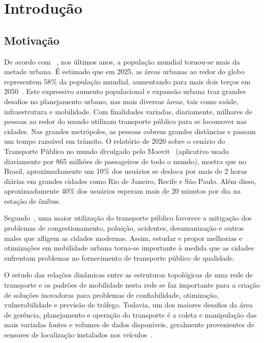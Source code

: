 


\chapter{Introdução}\label{cap:introducao}

\section{Motivação}

De acordo com ~\cite{Dem:20}, nos últimos anos, a população mundial tornou-se mais da metade urbana. É estimado que em 2025, as áreas urbanas ao redor do globo representem 58\% da população mundial, aumentando para mais dois terços em 2050~\cite{new:20}. 
Este expressivo aumento populacional e expansão urbana traz grandes desafios no planejamento urbano, nas mais diversas áreas, tais como saúde, infraestrutura e mobilidade. 
Com finalidades variadas, diariamente, milhares de pessoas ao redor do mundo utilizam transporte público para se locomover nas cidades.
Nas grandes metrópoles, as pessoas cobrem grandes distâncias e passam um tempo razoável em trânsito.
O relatório de 2020 sobre o cenário do Transporte Público no mundo divulgado pelo Moovit~\cite{Mov:20} (aplicativo usado diariamente por 865 milhões de passageiros de todo o mundo), mostra que no Brasil, aproximadamente
um 10\% dos usuários se desloca por mais de 2 horas diárias em grandes cidades como Rio de Janeiro, Recife e São Paulo. Além disso, aproximadamente 40\% dos usuários esperam mais de 20 minutos por dia na estação de ônibus.

\textcolor{courb2020}{
Segundo~\cite{fer:04}, uma maior utilização do transporte público favorece a mitigação dos problemas de congestionamento, poluição, acidentes, desumanização e outros males que afligem as cidades modernas. 
Assim, estudar e propor melhorias e otimizações em mobilidade urbana torna-se importante à medida que as cidades enfrentam problemas no fornecimento de transporte público de qualidade.
}

\textcolor{courb2020}{
O estudo das relações dinâmicas entre as estruturas topológicas de uma rede de transporte e os padrões de mobilidade nesta rede se faz importante para a criação de soluções inovadoras para problemas de confiabilidade, otimização, vulnerabilidade e previsão de tráfego. Todavia, um dos maiores desafios da área de gerência, planejamento e operação do transporte é a coleta e manipulação das mais variadas fontes e volumes de dados disponíveis, geralmente provenientes de sensores de localização instalados nos veículos~\cite{wes:17}. 
}


